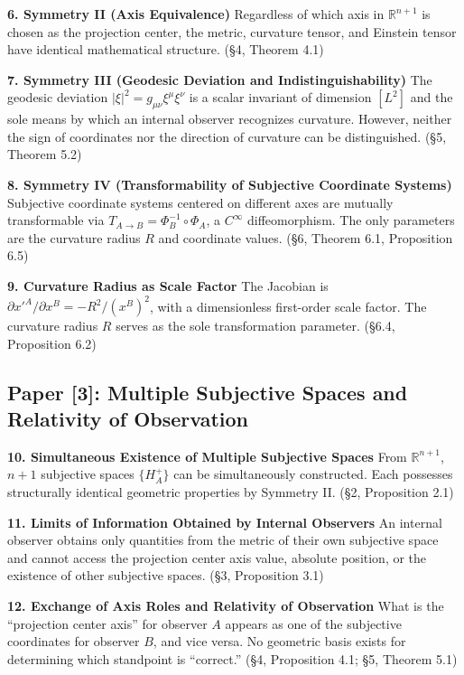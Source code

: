 \documentclass[12pt,a4paper]{article}
\begin{document}
\textbf{6. Symmetry II (Axis Equivalence)}\quad
Regardless of which axis in $\mathbb{R}^{n+1}$ is chosen as the projection center, the metric, curvature tensor, and Einstein tensor have identical mathematical structure. (\S 4, Theorem 4.1)

\textbf{7. Symmetry III (Geodesic Deviation and Indistinguishability)}\quad
The geodesic deviation $|\xi|^2 = g_{\mu\nu}\xi^\mu\xi^\nu$ is a scalar invariant of dimension $[L^2]$ and the sole means by which an internal observer recognizes curvature. However, neither the sign of coordinates nor the direction of curvature can be distinguished. (\S 5, Theorem 5.2)

\textbf{8. Symmetry IV (Transformability of Subjective Coordinate Systems)}\quad
Subjective coordinate systems centered on different axes are mutually transformable via $T_{A \to B} = \Phi_B^{-1} \circ \Phi_A$, a $C^\infty$ diffeomorphism. The only parameters are the curvature radius $R$ and coordinate values. (\S 6, Theorem 6.1, Proposition 6.5)

\textbf{9. Curvature Radius as Scale Factor}\quad
The Jacobian is $\partial x'^A/\partial x^B = -R^2/(x^B)^2$, with a dimensionless first-order scale factor. The curvature radius $R$ serves as the sole transformation parameter. (\S 6.4, Proposition 6.2)

\subsection*{Paper [3]: Multiple Subjective Spaces and Relativity of Observation}

\textbf{10. Simultaneous Existence of Multiple Subjective Spaces}\quad
From $\mathbb{R}^{n+1}$, $n+1$ subjective spaces $\{H_A^+\}$ can be simultaneously constructed. Each possesses structurally identical geometric properties by Symmetry II. (\S 2, Proposition 2.1)

\textbf{11. Limits of Information Obtained by Internal Observers}\quad
An internal observer obtains only quantities from the metric of their own subjective space and cannot access the projection center axis value, absolute position, or the existence of other subjective spaces. (\S 3, Proposition 3.1)

\textbf{12. Exchange of Axis Roles and Relativity of Observation}\quad
What is the ``projection center axis'' for observer $A$ appears as one of the subjective coordinates for observer $B$, and vice versa. No geometric basis exists for determining which standpoint is ``correct.'' (\S 4, Proposition 4.1; \S 5, Theorem 5.1)
\end{document}

